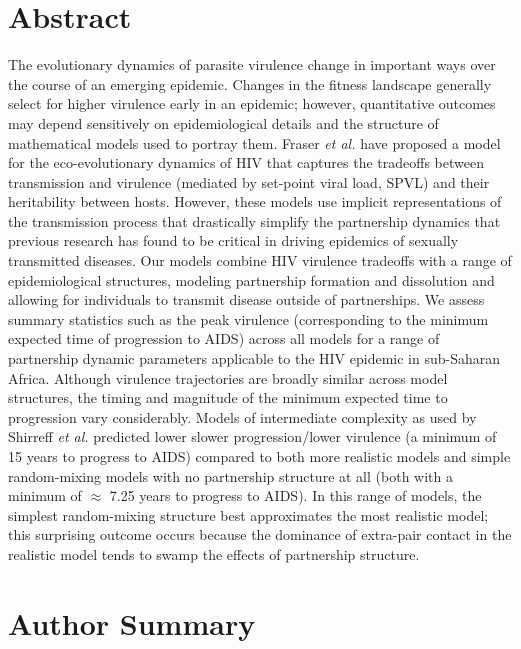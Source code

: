 \documentclass[10pt,letterpaper]{article}
\begin{document}
\section*{Abstract}
The evolutionary dynamics of parasite virulence change
in important ways over the
course of an emerging epidemic.
Changes in the fitness landscape
generally select for higher virulence early in an
epidemic; however, quantitative outcomes
may depend sensitively on epidemiological details and the structure of
mathematical models used to portray them.  Fraser \emph{et al.} 
have proposed a model for the eco-evolutionary
dynamics of HIV that captures
the tradeoffs between transmission and virulence (mediated by
set-point viral load, SPVL) and their heritability between
hosts. However, these models use implicit
representations of the transmission process that drastically simplify the
partnership dynamics that previous research has found to be critical
in driving epidemics of sexually transmitted diseases.  
Our models combine HIV virulence tradeoffs with a range of
epidemiological structures, modeling partnership formation and
dissolution and allowing for individuals to transmit disease outside
of partnerships. We assess summary statistics such as the peak virulence
(corresponding to the minimum expected time of progression to AIDS) across all
models for a range of 
partnership dynamic parameters 
applicable to the HIV epidemic in sub-Saharan Africa.
Although virulence trajectories are broadly similar
across model structures, the timing and magnitude of the 
minimum expected time to progression vary
considerably.
Models of intermediate
complexity as used by Shirreff \emph{et al.}
predicted lower slower progression/lower virulence (a minimum of 15 years to
progress to AIDS) compared to both more realistic models
and simple random-mixing models with no partnership structure
at all (both with a minimum of $\approx$ 7.25 years to progress to AIDS).
In this range of models, the simplest random-mixing structure best
approximates the most realistic model; this
surprising outcome occurs because the dominance of extra-pair
contact in the realistic model tends to swamp the effects of
partnership structure.

\section*{Author Summary}
\end{document}
